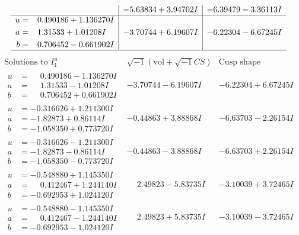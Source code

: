 \documentclass[1p]{elsarticle_modified}
\theoremstyle{definition}
\newcommand{\I}{\sqrt{-1}}
\begin{document}
$$\begin{array}{c|c|c}
 & -5.63834 + 3.94702 I & -6.39479 - 3.36113 I \\ \hline\begin{aligned}
u &= \phantom{-}0.490186 + 1.136270 I \\
a &= \phantom{-}1.31533 + 1.01208 I \\
b &= \phantom{-}0.706452 - 0.661902 I\end{aligned}
 & -3.70744 + 6.19607 I & -6.22304 - 6.67245 I\\
 \hline 
 \end{array}$$\newpage$$\begin{array}{c|c|c}  
\text{Solutions to }I^u_{1}& \I (\text{vol} + \sqrt{-1}CS) & \text{Cusp shape}\\
 \hline 
\begin{aligned}
u &= \phantom{-}0.490186 - 1.136270 I \\
a &= \phantom{-}1.31533 - 1.01208 I \\
b &= \phantom{-}0.706452 + 0.661902 I\end{aligned}
 & -3.70744 - 6.19607 I & -6.22304 + 6.67245 I \\ \hline\begin{aligned}
u &= -0.316626 + 1.211300 I \\
a &= -1.82873 + 0.86114 I \\
b &= -1.058350 + 0.773720 I\end{aligned}
 & -0.44863 + 3.88868 I & -6.63703 - 2.26154 I \\ \hline\begin{aligned}
u &= -0.316626 - 1.211300 I \\
a &= -1.82873 - 0.86114 I \\
b &= -1.058350 - 0.773720 I\end{aligned}
 & -0.44863 - 3.88868 I & -6.63703 + 2.26154 I \\ \hline\begin{aligned}
u &= -0.548880 + 1.145350 I \\
a &= \phantom{-}0.412467 + 1.244140 I \\
b &= -0.692953 + 1.024120 I\end{aligned}
 & \phantom{-}2.49823 - 5.83735 I & -3.10039 + 3.72465 I \\ \hline\begin{aligned}
u &= -0.548880 - 1.145350 I \\
a &= \phantom{-}0.412467 - 1.244140 I \\
b &= -0.692953 - 1.024120 I\end{aligned}
 & \phantom{-}2.49823 + 5.83735 I & -3.10039 - 3.72465 I \\ \hline\begin{aligned}

\end{aligned}
\end{array}$$
\end{document}

